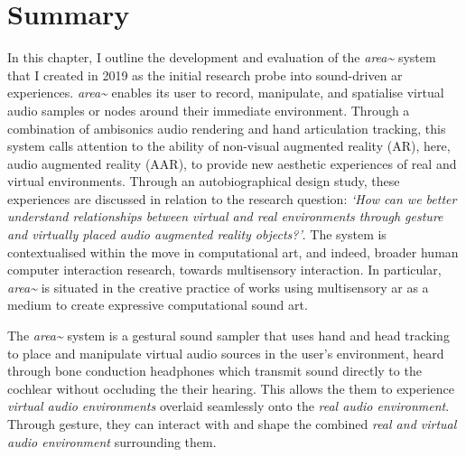 \clearpage



\section{Summary}\label{sec: area-summary}
In this chapter, I outline the development and evaluation of the \textit{area\textasciitilde{}} system that I created in 2019 as the initial research probe into sound-driven \gls{ar} experiences. \textit{area\textasciitilde{}} enables its user to record, manipulate, and spatialise virtual audio samples or nodes around their immediate environment. Through a combination of ambisonics audio rendering and hand articulation tracking, this system calls attention to the ability of non-visual augmented reality (AR), here, audio augmented reality (AAR), to provide new aesthetic experiences of real and virtual environments.
Through an autobiographical design study, these experiences are discussed in relation to the research question: \textit{`How can we better understand relationships between virtual and real environments through gesture and virtually placed audio augmented reality objects?'}. The system is contextualised within the move in computational art, and indeed, broader human computer interaction research, towards multisensory interaction. In particular, \textit{area\textasciitilde{}} is situated in the creative practice of works using multisensory \gls{ar} as a medium to create expressive computational sound art.

The \textit{area\textasciitilde{}} system is a gestural sound sampler that uses hand and head tracking to place and manipulate virtual audio sources in the user's environment, heard through bone conduction headphones which transmit sound directly to the cochlear without occluding the their hearing. This allows the them to experience \textit{virtual audio environments} overlaid seamlessly onto the \textit{real audio environment}. Through gesture, they can interact with and shape the combined \textit{real and virtual audio environment} surrounding them.

